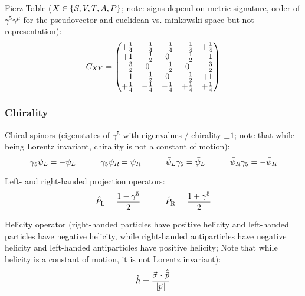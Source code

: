 			\noindent
			Fierz Table ($X\in\qty{S,V,T,A,P}$; note: signs depend on metric signature, order of $\gamma^5 \gamma^\mu$ for the pseudovector and euclidean vs. minkowski space but not representation):
			\begin{equation}
				C_{XY} = \mqty(
				+\frac{1}{4} & +\frac{1}{4} & -\frac{1}{4} & -\frac{1}{4} & +\frac{1}{4} \\
				+1 & -\frac{1}{2} & 0 & -\frac{1}{2} & -1 \\
				-\frac{3}{2} & 0 & -\frac{1}{2} & 0 & -\frac{3}{2} \\
				-1 & -\frac{1}{2} & 0 & -\frac{1}{2} & +1 \\
				+\frac{1}{4} & -\frac{1}{4} & -\frac{1}{4} & +\frac{1}{4} & +\frac{1}{4} \\
				)
			\end{equation}

		\subsubsection{Chirality}
			\noindent
			Chiral spinors (eigenstates of $\gamma^5$ with eigenvalues / chirality $\pm 1$; note that while being Lorentz invariant, chirality is not a constant of motion):
			\begin{equation}
				\gamma_5 \psi_L = - \psi_L
				\hspace{30pt} \gamma_5 \psi_R = \psi_R
				\hspace{30pt} \bar{\psi}_L \gamma_5 = \bar{\psi}_L
				\hspace{30pt} \bar{\psi}_R \gamma_5 = -\bar{\psi}_R
			\end{equation}

			\noindent
			Left- and right-handed projection operators:
			\begin{equation}
				\label{Eq:SpinorProjectionOperators}
				\hat{P}_{\mathrm{L}}=\frac{1-\gamma^{5}}{2} \hspace{30pt}
				\hat{P}_{\mathrm{R}}=\frac{1+\gamma^{5}}{2}
			\end{equation}

			\noindent
			Helicity operator (\ie right-handed particles have positive helicity and left-handed particles have negative helicity, while right-handed antiparticles have negative helicity and left-handed antiparticles have positive helicity; Note that while helicity is a constant of motion, it is not Lorentz invariant):
			\begin{equation}
				\hat{h} = \frac{\vec{\sigma}\cdot\hat{\vec{p}}}{\abs{\vec{p}}}
			\end{equation}

